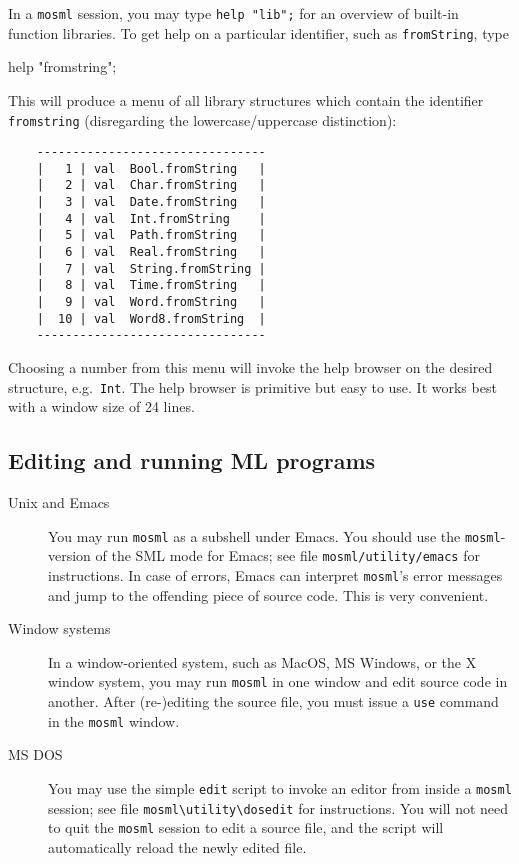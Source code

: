 \documentclass[fleqn]{article}
\begin{document}
In a {\tt mosml} session, you may type {\tt help "lib";} for an
overview of built-in function libraries.  To get help on a particular
identifier, such as {\tt fromString}, type

\begin{program}
help "fromstring";
\end{program}

\noindent This will produce a menu of all library structures which
contain the identifier {\tt fromstring} (disregarding the
lowercase/uppercase distinction):

{\small\begin{verbatim}
    --------------------------------
    |   1 | val  Bool.fromString   |
    |   2 | val  Char.fromString   |
    |   3 | val  Date.fromString   |
    |   4 | val  Int.fromString    |
    |   5 | val  Path.fromString   |
    |   6 | val  Real.fromString   |
    |   7 | val  String.fromString |
    |   8 | val  Time.fromString   |
    |   9 | val  Word.fromString   |
    |  10 | val  Word8.fromString  |
    --------------------------------
\end{verbatim}}

\noindent Choosing a number from this menu will invoke the help
browser on the desired structure, e.g.\ {\tt Int}.  The help browser
is primitive but easy to use.  It works best with a window size of 24
lines.


\subsection{Editing and running ML programs}
\label{sec-editing}
\begin{description}
\item[Unix and Emacs] You may run {\tt mosml} as a subshell under
  Emacs.  You should use the {\tt mosml}-version of the SML mode for
  Emacs; see file {\tt mosml/utility/emacs} for instructions.  In case
  of errors, Emacs can interpret {\tt mosml}'s error messages and jump
  to the offending piece of source code.  This is very convenient.

\item[Window systems] In a window-oriented system, such as MacOS, MS
  Windows, or the X window system, you may run {\tt mosml} in one
  window and edit source code in another.  After (re-)editing the
  source file, you must issue a {\tt use} command in the {\tt mosml}
  window.

\item[MS DOS] You may use the simple {\tt edit} script to invoke an
  editor from inside a {\tt mosml} session; see file
  \verb#mosml\utility\dosedit# for instructions.  You will not need to
  quit the {\tt mosml} session to edit a source file, and the script
  will automatically reload the newly edited file.
\end{description}
\end{document}
